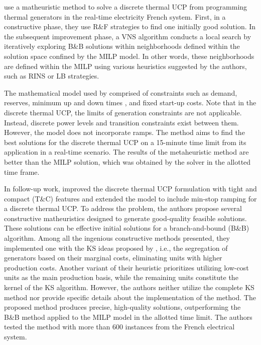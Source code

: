 \citet{Dupin2016} use a matheuristic method to solve a discrete thermal UCP from programming thermal generators in the real-time electricity French system. 
First, in a constructive phase, they use R\&F strategies to find one initially good solution. 
In the subsequent improvement phase, a VNS algorithm conducts a local search by iteratively exploring B\&B solutions within neighborhoods defined within the solution space confined by the MILP model. In other words, these neighborhoods are defined within the MILP using various heuristics suggested by the authors, such as RINS or LB strategies.

The mathematical model used by \citet{Dupin2017} comprised of constraints such as demand, reserves, minimum up and down times \citep{Rajan2005}, and fixed start-up costs. 
Note that in the discrete thermal UCP, the limits of generation constraints are not applicable. Instead, discrete power levels and transition constraints exist between them.
However, the model does not incorporate ramps.
The method aims to find the best solutions for the discrete thermal UCP on a 15-minute time limit from its application in a real-time scenario.
The results of the metaheuristic method are better than the MILP solution, which was obtained by the solver in the allotted time frame. 

In follow-up work, \citet{Dupin2018} improved the discrete thermal UCP formulation with tight and compact (T\&C) features and extended the model to include min-stop ramping for a discrete thermal UCP.  To address the problem, the authors propose several constructive matheuristics designed to generate good-quality feasible solutions. These solutions can be effective initial solutions for a branch-and-bound (B\&B) algorithm. Among all the ingenious constructive methods presented, they implemented one with the KS ideas proposed by \citet{Guastaroba2017}, i.e., the segregation of generators based on their marginal costs, eliminating units with higher production costs. Another variant of their heuristic prioritizes utilizing low-cost units as the main production basis, while the remaining units constitute the kernel of the KS algorithm. However, the authors neither utilize the complete KS method nor provide specific details about the implementation
of the method. The proposed method produces precise, high-quality solutions, outperforming the B\&B method applied to the MILP model in the allotted time limit.
The authors tested the method with more than 600 instances from the French electrical system.


